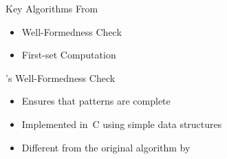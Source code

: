 \documentclass{beamer}
\begin{document}
\begin{frame}{Key Algorithms From \lpeg{}}
    \begin{itemize}
        \item Well-Formedness Check
        \item First-set Computation
    \end{itemize}
\end{frame}

\begin{frame}{\lpeg{}'s Well-Formedness Check}
    \begin{itemize}
        \item Ensures that patterns are complete
        \item Implemented in~C using simple data structures
        \item Different from the original algorithm by \citeauthor{ford_parsing_2004}
    \end{itemize}
\end{frame}
\end{document}
